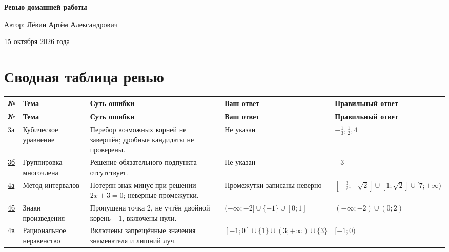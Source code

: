\documentclass[12pt,a4paper]{article}
\begin{document}
\begin{titlepage}
\thispagestyle{empty}
\vspace*{0.29\textheight}
\begin{center}
{\LARGE\bfseries Ревью домашней работы\par}
\vspace{20mm}
{\large Автор: Лёвин Артём Александрович\par}
\vspace{9mm}
{\large 15 октября 2026 года\par}
\end{center}
\vfill
\begin{center}
\end{center}
\end{titlepage}

\newpage
\section*{Сводная таблица ревью}
\footnotesize
\begin{longtable}{@{}p{1.15cm}p{2.5cm}p{4.2cm}p{2.8cm}p{3.9cm}@{}}
\toprule
\textbf{№} & \textbf{Тема} & \textbf{Суть ошибки} & \textbf{Ваш ответ} & \textbf{Правильный ответ}\\
\midrule
\endfirsthead
\toprule
\textbf{№} & \textbf{Тема} & \textbf{Суть ошибки} & \textbf{Ваш ответ} & \textbf{Правильный ответ}\\
\midrule
\endhead
\hyperref[task:3a]{3а} & Кубическое уравнение & Перебор возможных корней не завершён; дробные кандидаты не проверены. & Не указан & $-\frac13,\frac12,4$\\ \midrule
\hyperref[task:3b]{3б} & Группировка многочлена & Решение обязательного подпункта отсутствует. & Не указан & $-3$\\ \midrule
\hyperref[task:4a]{4а} & Метод интервалов & Потерян знак минус при решении $2x+3=0$; неверные промежутки. & Промежутки записаны неверно & $\left[-\frac32;-\sqrt2\right]\cup[1;\sqrt2]\cup[7;+\infty)$\\ \midrule
\hyperref[task:4b]{4б} & Знаки произведения & Пропущена точка $2$, не учтён двойной корень $-1$, включены нули. & $(-\infty;-2]\cup\{-1\}\cup[0;1]$ & $(-\infty;-2)\cup(0;2)$\\ \midrule
\hyperref[task:4c]{4в} & Рациональное неравенство & Включены запрещённые значения знаменателя и лишний луч. & $[-1;0]\cup\{1\}\cup(3;+\infty)\cup\{3\}$ & $[-1;0)$\\
\bottomrule
\end{longtable}
\normalsize
\end{document}
